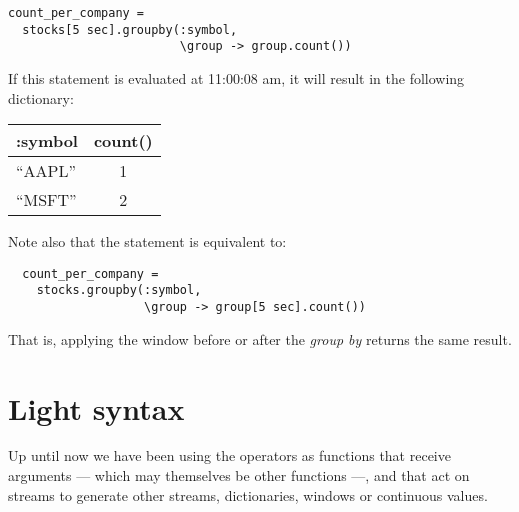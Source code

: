 \documentclass{report}
\begin{document}
\begin{verbatim}
count_per_company =
  stocks[5 sec].groupby(:symbol,
                        \group -> group.count())
\end{verbatim}

If this statement is evaluated at 11:00:08 am, it will result in the
following dictionary:

\begin{tabular}{ |l|c| }
  \hline
  :symbol & count() \\
  \hline
  ``AAPL'' & 1 \\
  ``MSFT'' & 2 \\
  \hline
\end{tabular}

Note also that the statement is equivalent to:

\begin{verbatim}
  count_per_company =
    stocks.groupby(:symbol,
                   \group -> group[5 sec].count())
\end{verbatim}

That is, applying the window before or after the \emph{group by}
returns the same result.

%
%
%
%

\section{Light syntax}
\label{sec:light-syntax}

Up until now we have been using the operators as functions that
receive arguments --- which may themselves be other functions ---, and
that act on streams to generate other streams, dictionaries, windows
or continuous values.
\end{document}
